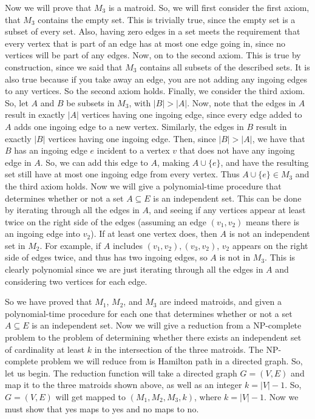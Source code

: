 \documentclass{article}
\begin{document}
Now we will prove that $M_3$ is a matroid. So,
we will first consider the first axiom, that $M_3$ contains the empty set. This
is trivially true, since the empty set is a subset of every set. Also, having
zero edges in a set meets the requirement that every vertex that is part of an
edge has at most one edge going in, since no vertices will be part of any edges.
Now, on to the second axiom. This is true by construction, since we said that
$M_3$ contains all subsets of the described sets. It is also true because if you
take away an edge, you are not adding any ingoing edges to any vertices. So the
second axiom holds. Finally, we consider the third axiom. So, let $A$ and $B$ be
subsets in $M_3$, with $|B| > |A|$. Now, note that the edges in $A$ result in exactly $|A|$
vertices having one ingoing edge, since every edge added to $A$ adds one
ingoing edge to a new vertex. Similarly, the edges in $B$ result in exactly
$|B|$ vertices having one ingoing edge. Then, since $|B| > |A|$, we have that
$B$ has an ingoing edge $e$ incident to a vertex $v$ that does not have any ingoing edge
in $A$. So, we can add this edge to $A$, making $A \cup \{e\}$, and have the
resulting set still have at most one ingoing edge from every vertex. Thus $A
\cup \{e\} \in M_3$ and the third axiom holds. Now we will give a
polynomial-time procedure that determines whether or not a set $A \subseteq E$ is an
independent set. This can be done by iterating through all the edges in $A$, and
seeing if any vertices appear at least twice on the right side of the
edges (assuming an edge $(v_1,
v_2)$ means there is an ingoing edge into $v_2$). If at least one
vertex does, then $A$ is not an independent set in $M_2$. For example, if $A$
includes $(v_1, v_2), (v_3, v_2)$, $v_2$ appears on the right side of edges
twice, and thus has two ingoing edges, so $A$ is not in $M_3$. This is clearly
polynomial since we are just iterating through all the edges in $A$ and
considering two vertices for each edge.

So we have proved that $M_1$, $M_2$, and $M_3$ are indeed matroids, and given a
polynomial-time procedure for each one that determines whether or not a set
$A \subseteq E$ is an independent set. Now we will
give a reduction from a NP-complete problem to the problem of determining
whether there exists an independent set of cardinality at least $k$ in the
intersection of the three matroids. The NP-complete problem we will reduce from
is Hamilton path in a directed graph. So, let us begin. The reduction function
will take a directed graph $G = (V,E)$ and map it to the three matroids shown
above, as well as an integer $k = |V| - 1$. So, $G = (V,E)$ will get mapped to
$(M_1, M_2, M_3, k)$, where $k = |V| - 1$. Now we must show that yes maps to yes
and no maps to no.
\end{document}
